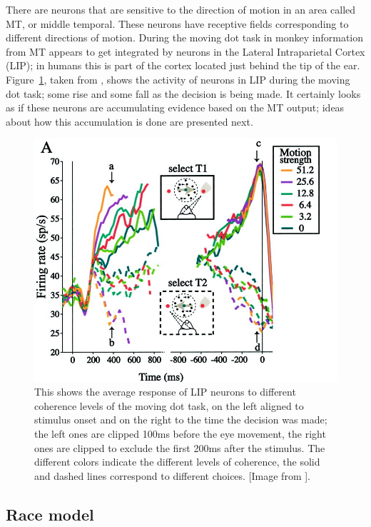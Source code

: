 \documentclass[11pt,a4paper]{scrartcl}
\begin{document}
There are neurons that are sensitive to the direction of motion in an
area called MT, or middle temporal. These neurons have receptive
fields corresponding to different directions of motion. During the
moving dot task in monkey information from MT appears to get
integrated by neurons in the Lateral Intraparietal Cortex (LIP); in
humans this is part of the cortex located just behind the tip of the
ear.  Figure~\ref{fig:LIP}, taken from \cite{RoitmanShadlen2002a},
shows the activity of neurons in LIP during the moving dot task; some
rise and some fall as the decision is being made. It certainly looks
as if these neurons are accumulating evidence based on the MT output;
ideas about how this accumulation is done are presented next.

\begin{figure}
\begin{center}
\includegraphics[width=12cm]{F7.jpg}
\end{center}
\caption{This shows the average response of LIP neurons to different
  coherence levels of the moving dot task, on the left aligned to
  stimulus onset and on the right to the time the decision was made;
  the left ones are clipped 100ms before the eye movement, the right
  ones are clipped to exclude the first 200ms after the stimulus. The different colors indicate the different levels of coherence, the solid and dashed lines correspond to different choices. [Image from \cite{RoitmanShadlen2002a}].\label{fig:LIP}}
\end{figure}

\subsection*{Race model}
\end{document}

